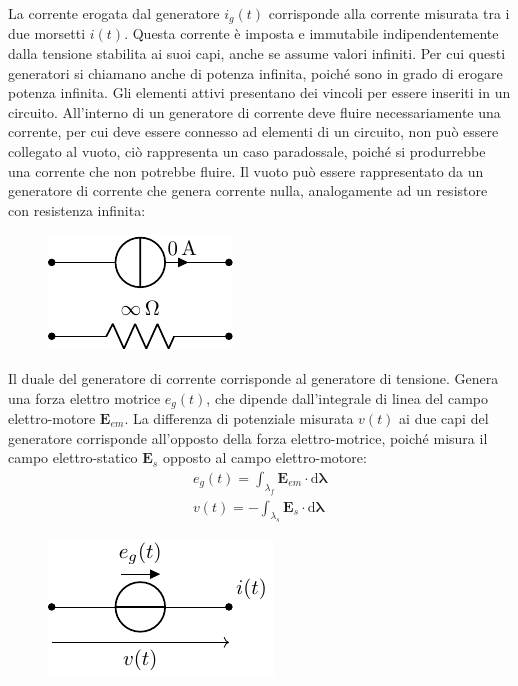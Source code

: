 \documentclass{article}
\newcommand{\vect}[1]{\boldsymbol{\mathbf{#1}}}
\newcommand{\df}{\mathrm{d}}
\numberwithin{equation}{subsection}
\begin{document}
La corrente erogata dal generatore $i_g(t)$ corrisponde alla corrente misurata tra i due morsetti $i(t)$. Questa corrente è imposta e immutabile indipendentemente dalla tensione 
stabilita ai suoi capi, anche se assume valori infiniti. Per cui questi generatori si chiamano anche di potenza infinita, poiché sono in grado di erogare potenza infinita. 
Gli elementi attivi presentano dei vincoli per essere inseriti in un circuito. All'interno di un generatore di corrente deve fluire necessariamente una corrente, per cui deve 
essere connesso ad elementi di un circuito, non può essere collegato al vuoto, ciò rappresenta un caso paradossale, poiché si produrrebbe una corrente che non potrebbe fluire. 
Il vuoto può essere rappresentato da un generatore di corrente che genera corrente nulla, analogamente ad un resistore con resistenza infinita: 
\begin{figure}[H]%
    \centering
    \includegraphics{vuoto.pdf}%
    \label{fig:vuoto}
\end{figure}


Il duale del generatore di corrente corrisponde al generatore di tensione. Genera una forza elettro motrice $e_g(t)$, che dipende dall'integrale di linea del campo 
elettro-motore $\vect{E}_{em}$. La differenza di potenziale misurata $v(t)$ ai due capi del generatore corrisponde all'opposto della forza elettro-motrice, poiché misura il 
campo elettro-statico $\vect{E}_s$ opposto al campo elettro-motore: 
\begin{gather*}
    e_g(t)=\displaystyle\int_{\lambda_f}\vect{E}_{em}\cdot \df\vect{\lambda}\\
    v(t)=-\displaystyle\int_{\lambda_s}\vect{E}_s\cdot \df\vect{\lambda}
\end{gather*}
\begin{figure}[H]%
    \centering
    \includegraphics{generatore-tensione.pdf}%
    \label{fig:generatore-tensione}
\end{figure}
\end{document}
